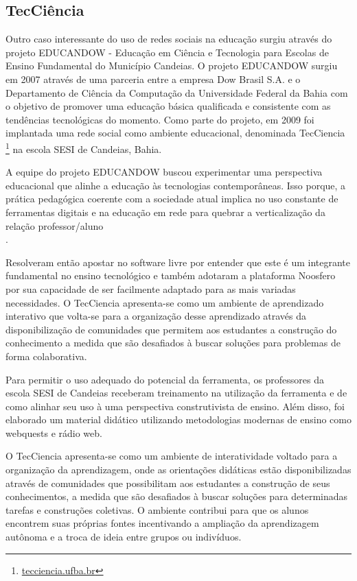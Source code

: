 \subsection{TecCiência}
\label{subsec:tecciencia}

Outro caso interessante do uso de redes sociais na educação surgiu através do
projeto EDUCANDOW \cite{santos2012} - Educação em Ciência e Tecnologia para
Escolas de Ensino Fundamental do Município Candeias. O projeto EDUCANDOW surgiu
em 2007 através de uma parceria entre a empresa Dow Brasil S.A. e o Departamento
de Ciência da Computação da Universidade Federal da Bahia com o objetivo de
promover uma educação básica qualificada e consistente com as tendências tecnológicas
do momento. Como parte do projeto, em 2009 foi implantada uma rede social como
ambiente educacional, denominada TecCiencia \footnote{\url{tecciencia.ufba.br}}
na escola SESI de Candeias, Bahia.

A equipe do projeto EDUCANDOW buscou experimentar uma perspectiva educacional que
alinhe a educação às tecnologias contemporâneas.
%
Isso porque, a prática pedagógica coerente com a sociedade atual implica no uso
constante de ferramentas digitais e na educação em rede para quebrar a verticalização
da relação professor/aluno \\ \cite{santos2012}.

Resolveram então apostar no software livre por entender que este é um integrante
fundamental no ensino tecnológico e também adotaram a plataforma Noosfero por sua
capacidade de ser facilmente adaptado para as mais variadas necessidades. O
TecCiencia apresenta-se como um ambiente de aprendizado interativo que volta-se
para a organização desse aprendizado através da disponibilização de comunidades
que permitem aos estudantes a construção do conhecimento a medida que são
desafiados à buscar soluções para problemas de forma colaborativa.

Para permitir o uso adequado do potencial da ferramenta, os professores da escola
SESI de Candeias receberam treinamento na utilização da ferramenta e de como alinhar
seu uso à uma perspectiva construtivista de ensino. Além disso, foi elaborado um
material didático utilizando metodologias modernas de ensino como webquests e
rádio web.

O TecCiencia apresenta-se como um ambiente de interatividade voltado para a
organização da aprendizagem, onde as orientações didáticas estão disponibilizadas
através de comunidades que possibilitam aos estudantes a construção de seus
conhecimentos, a medida que são desafiados à buscar soluções para determinadas
tarefas e construções coletivas. O ambiente contribui para que os alunos encontrem
suas próprias fontes incentivando a ampliação da aprendizagem autônoma e a
troca de ideia entre grupos ou indivíduos.


